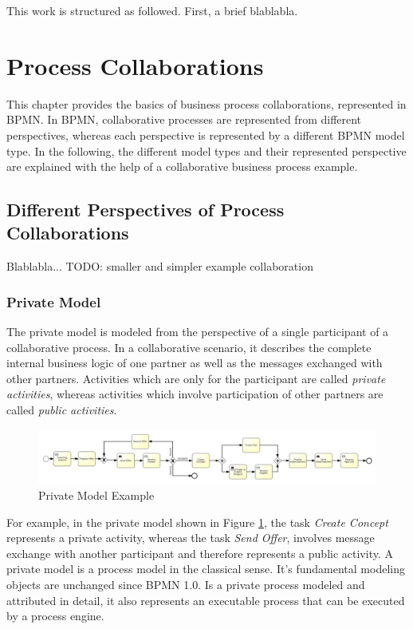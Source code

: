\documentclass[runningheads]{llncs}
\begin{document}
This work is structured as followed. First, a brief blablabla.

\section{Process Collaborations} %
This chapter provides the basics of business process collaborations, represented in BPMN. In BPMN, collaborative processes are represented from different perspectives, whereas each perspective is represented by a different BPMN model type. In the following, the different model types and their represented perspective are explained with the help of a collaborative business process example.

\subsection{Different Perspectives of Process Collaborations}
Blablabla... TODO: smaller and simpler example collaboration

\subsubsection{Private Model}
The private model is modeled from the perspective of a single participant of a collaborative process. In a collaborative scenario, it describes the complete internal business logic of one partner as well as the messages exchanged with other partners. Activities which are only for the participant are called \textit{private activities}, whereas activities which involve participation of other partners are called \textit{public activities}.\\

\begin{figure}
\centering
\includegraphics[width=\textwidth]{images/private_process_agency.png}
\caption{Private Model Example}
\label{fig:privateModel}
\end{figure}

For example, in the private model shown in Figure \ref{fig:privateModel}, the task \textit{Create Concept} represents a private activity, whereas the task \textit{Send Offer}, involves message exchange with another participant and therefore represents a public activity. A private model is a process model in the classical sense. It's fundamental modeling objects are unchanged since BPMN 1.0. Is a private process modeled and attributed in detail, it also represents an executable process that can be executed by a process engine.
\end{document}
